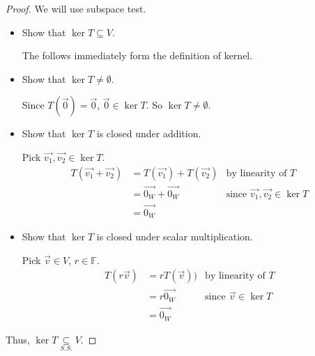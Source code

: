 \documentclass[11pt,fleqn]{book} %
\begin{document}
\begin{proof}
    We will use subspace test. 
    
    \begin{itemize}
        \item Show that $\ker T \subseteq V$. 

        The follows immediately form the definition of kernel. 

        \item Show that $\ker T \neq \emptyset$.
        
        Since $T(\overrightarrow{0})=\overrightarrow{0}$, $\overrightarrow{0} \in \ker T$. So $\ker T \neq \emptyset$. 

        \item Show that $\ker T$ is closed under addition. 
        
        Pick $\overrightarrow{v_1}, \overrightarrow{v_2} \in \ker T$. 
        \begin{align*}
            T(\overrightarrow{v_1} + \overrightarrow{v_2})
            &=T(\overrightarrow{v_1}) + T(\overrightarrow{v_2})
            &\text{by linearity of }T
            \\
            &=\overrightarrow{0_W}+\overrightarrow{0_W}
            &\text{since }\overrightarrow{v_1}, \overrightarrow{v_2} \in \ker T
            \\
            &=\overrightarrow{0_W}
        \end{align*}

        \item Show that $\ker T$ is closed under scalar multiplication. 
        
        Pick $\overrightarrow{v} \in V$, $r \in \mathbb{F}$. 
        \begin{align*}
            T(r\overrightarrow{v})
            &=rT(\overrightarrow{v}))
            &\text{by linearity of }T
            \\
            &=r\overrightarrow{0_W}
            &\text{since }\overrightarrow{v} \in \ker T
            \\
            &=\overrightarrow{0_W}
        \end{align*}
    \end{itemize}
    
    Thus, $\ker T \underset{S.S.}{\subseteq} V$. 
\end{proof}
\end{document}
